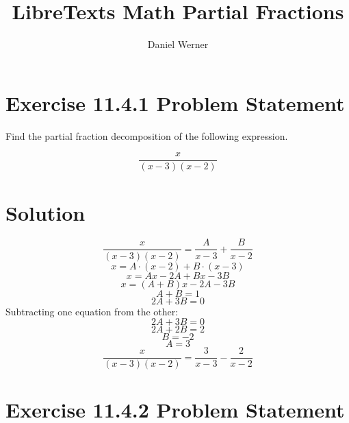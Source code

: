 \documentclass{article}
\title{LibreTexts Math Partial Fractions}
\author{Daniel Werner}
\begin{document}
\maketitle

\section*{Exercise 11.4.1 Problem Statement}

Find the partial fraction decomposition of the following expression.

\begin{equation*}
    \frac{x}{(x-3)(x-2)}
\end{equation*}

\section*{Solution}


\begin{equation*}
    \frac{x}{(x-3)(x-2)} = \frac{A}{x-3} + \frac{B}{x-2}
\end{equation*}
\begin{equation*}
    x = A \cdot (x-2) + B \cdot (x - 3)
\end{equation*}
\begin{equation*}
    x = Ax - 2A + Bx - 3B
\end{equation*}
\begin{equation*}
    x = (A + B)x - 2A - 3B
\end{equation*}
\begin{equation*}
    A + B = 1
\end{equation*}
\begin{equation*}
    2A + 3B = 0
\end{equation*}
Subtracting one equation from the other:
\begin{equation*}
    2A + 3B = 0
\end{equation*}
\begin{equation*}
    2A + 2B = 2
\end{equation*}
\begin{equation*}
    B = -2
\end{equation*}
\begin{equation*}
    A = 3
\end{equation*}
\begin{equation*}
    \frac{x}{(x-3)(x-2)} = \frac{3}{x-3} - \frac{2}{x-2}
\end{equation*}

\section*{Exercise 11.4.2 Problem Statement}
\end{document}
